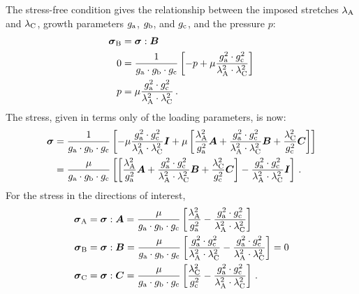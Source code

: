 \documentclass[10pt,letterpaper,oneside]{report}
\newcommand{\ten}[1]{\mbox{\boldmath $#1$}{}}
\newcommand{\scas}[1]{\mbox{{\scriptsize{${\rm{#1}}$}}}{}}
\begin{document}
The stress-free condition gives the relationship between the imposed stretches $\lambda_{\scas{A}}$ and $\lambda_{\scas{C}}$, growth parameters $g_{\scas{a}}$, $g_{\scas{b}}$, and $g_{\scas{c}}$, and the pressure $p$:
\begin{align}
\ten{\sigma}_{\scas{B}} &= \ten{\sigma} : \ten{B} \\
0 &= \frac{1}{g_{\scas{a}} \cdot g_{\scas{b}} \cdot g_{\scas{c}}} \left[ - p + \mu \frac{g_{\scas{a}}^2 \cdot g_{\scas{c}}^2}{\lambda_{\scas{A}}^2 \cdot \lambda_{\scas{C}}^2 } \right] \\
p &= \mu \frac{g_{\scas{a}}^2 \cdot g_{\scas{c}}^2}{\lambda_{\scas{A}}^2 \cdot \lambda_{\scas{C}}^2 }  \, .
\end{align}
The stress, given in terms only of the loading parameters, is now:
\begin{align}
\ten{\sigma} &= \frac{1}{g_{\scas{a}} \cdot g_{\scas{b}} \cdot g_{\scas{c}}} \left[ - \mu \frac{g_{\scas{a}}^2 \cdot g_{\scas{c}}^2}{\lambda_{\scas{A}}^2 \cdot \lambda_{\scas{C}}^2 } \ten{I} + \mu \left[ \frac{\lambda_{\scas{A}}^2}{g_{\scas{a}}^2} \ten{A} + \frac{g_{\scas{a}}^2 \cdot g_{\scas{c}}^2}{\lambda_{\scas{A}}^2 \cdot \lambda_{\scas{C}}^2 } \ten{B} + \frac{\lambda_{\scas{C}}^2}{g_{\scas{c}}^2} \ten{C} \right] \right] \\
&= \frac{\mu}{g_{\scas{a}} \cdot g_{\scas{b}} \cdot g_{\scas{c}}} \left[ \left[ \frac{\lambda_{\scas{A}}^2}{g_{\scas{a}}^2} \ten{A} + \frac{g_{\scas{a}}^2 \cdot g_{\scas{c}}^2}{\lambda_{\scas{A}}^2 \cdot \lambda_{\scas{C}}^2 } \ten{B} + \frac{\lambda_{\scas{C}}^2}{g_{\scas{c}}^2} \ten{C} \right] - \frac{g_{\scas{a}}^2 \cdot g_{\scas{c}}^2}{\lambda_{\scas{A}}^2 \cdot \lambda_{\scas{C}}^2 } \ten{I} \right]  \, .
\end{align}
For the stress in the directions of interest,
\begin{align}
\ten{\sigma}_{\scas{A}} &= \ten{\sigma} : \ten{A} = \frac{\mu}{g_{\scas{a}} \cdot g_{\scas{b}} \cdot g_{\scas{c}}} \left[ \frac{\lambda_{\scas{A}}^2}{g_{\scas{a}}^2} - \frac{g_{\scas{a}}^2 \cdot g_{\scas{c}}^2}{\lambda_{\scas{A}}^2 \cdot \lambda_{\scas{C}}^2 } \right] 
\\
\ten{\sigma}_{\scas{B}} &= \ten{\sigma} : \ten{B} = \frac{\mu}{g_{\scas{a}} \cdot g_{\scas{b}} \cdot g_{\scas{c}}} \left[ \frac{g_{\scas{a}}^2 \cdot g_{\scas{c}}^2}{\lambda_{\scas{A}}^2 \cdot \lambda_{\scas{C}}^2 } - \frac{g_{\scas{a}}^2 \cdot g_{\scas{c}}^2}{\lambda_{\scas{A}}^2 \cdot \lambda_{\scas{C}}^2 } \right] = 0 
\\
\ten{\sigma}_{\scas{C}} &= \ten{\sigma} : \ten{C} = \frac{\mu}{g_{\scas{a}} \cdot g_{\scas{b}} \cdot g_{\scas{c}}} \left[ \frac{\lambda_{\scas{C}}^2}{g_{\scas{c}}^2} - \frac{g_{\scas{a}}^2 \cdot g_{\scas{c}}^2}{\lambda_{\scas{A}}^2 \cdot \lambda_{\scas{C}}^2 } \right]  \, .
\end{align}
\end{document}
